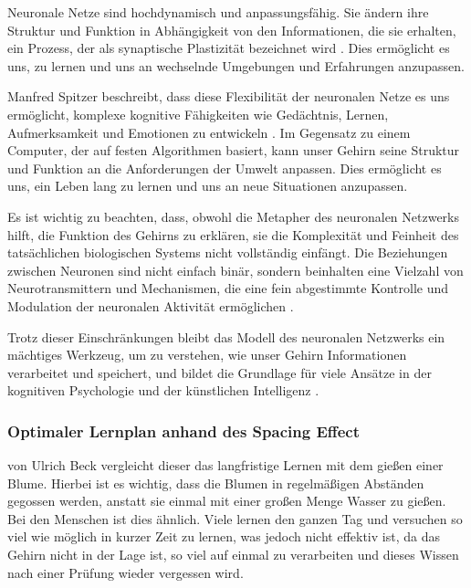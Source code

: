 \noindent
Neuronale Netze sind hochdynamisch und anpassungsfähig. Sie ändern ihre Struktur und Funktion in Abhängigkeit von den Informationen, die sie erhalten, ein Prozess, der als synaptische Plastizität bezeichnet wird \cite{Kandel2012}. Dies ermöglicht es uns, zu lernen und uns an wechselnde Umgebungen und Erfahrungen anzupassen. \newline

\noindent
Manfred Spitzer beschreibt, dass diese Flexibilität der neuronalen Netze es uns ermöglicht, komplexe kognitive Fähigkeiten wie Gedächtnis, Lernen, Aufmerksamkeit und Emotionen zu entwickeln \cite{Spitzer2002}. Im Gegensatz zu einem Computer, der auf festen Algorithmen basiert, kann unser Gehirn seine Struktur und Funktion an die Anforderungen der Umwelt anpassen. Dies ermöglicht es uns, ein Leben lang zu lernen und uns an neue Situationen anzupassen. \newline

\noindent
Es ist wichtig zu beachten, dass, obwohl die Metapher des neuronalen Netzwerks hilft, die Funktion des Gehirns zu erklären, sie die Komplexität und Feinheit des tatsächlichen biologischen Systems nicht vollständig einfängt. Die Beziehungen zwischen Neuronen sind nicht einfach binär, sondern beinhalten eine Vielzahl von Neurotransmittern und Mechanismen, die eine fein abgestimmte Kontrolle und Modulation der neuronalen Aktivität ermöglichen \cite{Cooke2006}. \newline

\noindent
Trotz dieser Einschränkungen bleibt das Modell des neuronalen Netzwerks ein mächtiges Werkzeug, um zu verstehen, wie unser Gehirn Informationen verarbeitet und speichert, und bildet die Grundlage für viele Ansätze in der kognitiven Psychologie und der künstlichen Intelligenz \cite{Hebb1949}. 
\newpage
\subsubsection{Optimaler Lernplan anhand des Spacing Effect}
 von Ulrich Beck vergleicht dieser das langfristige Lernen mit dem gießen einer Blume. Hierbei ist es wichtig, dass die Blumen in regelmäßigen Abständen gegossen werden, anstatt sie einmal mit einer großen Menge Wasser zu gießen. Bei den Menschen ist dies ähnlich. Viele lernen den ganzen Tag und versuchen so viel wie möglich in kurzer Zeit zu lernen, was jedoch nicht effektiv ist, da das Gehirn nicht in der Lage ist, so viel auf einmal zu verarbeiten und dieses Wissen nach einer Prüfung wieder vergessen wird. \cite[159]{beck_das_neue_lernen_heißt_verstehen} \newline

